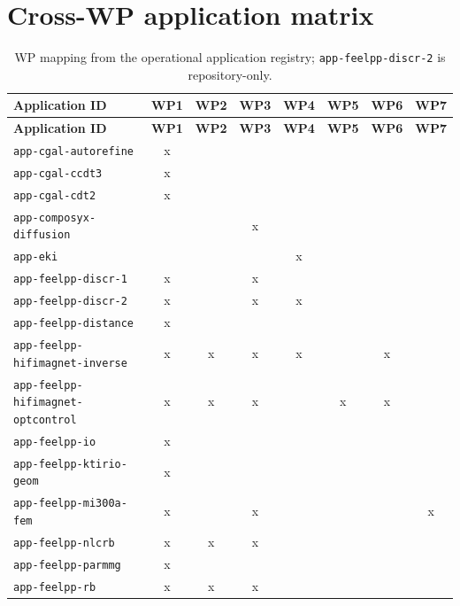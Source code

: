 \section{Cross-WP application matrix}
\label{sec:v3-cross-wp-application-matrix}

\begin{longtable}{@{}p{}ccccccc@{}}
\caption{WP mapping from the operational application registry; \nolinkurl{app-feelpp-discr-2} is repository-only.}
\label{tab:v3-cross-wp-application-matrix}\\
\toprule
\textbf{Application ID} & \textbf{WP1} & \textbf{WP2} & \textbf{WP3} & \textbf{WP4} & \textbf{WP5} & \textbf{WP6} & \textbf{WP7} \\
\midrule
\endfirsthead
\toprule
\textbf{Application ID} & \textbf{WP1} & \textbf{WP2} & \textbf{WP3} & \textbf{WP4} & \textbf{WP5} & \textbf{WP6} & \textbf{WP7} \\
\midrule
\endhead
\nolinkurl{app-cgal-autorefine} & x &  &  &  &  &  &  \\
\nolinkurl{app-cgal-ccdt3} & x &  &  &  &  &  &  \\
\nolinkurl{app-cgal-cdt2} & x &  &  &  &  &  &  \\
\nolinkurl{app-composyx-diffusion} &  &  & x &  &  &  &  \\
\nolinkurl{app-eki} &  &  &  & x &  &  &  \\
\nolinkurl{app-feelpp-discr-1} & x &  & x &  &  &  &  \\
\nolinkurl{app-feelpp-discr-2} & x &  & x & x &  &  &  \\
\nolinkurl{app-feelpp-distance} & x &  &  &  &  &  &  \\
\nolinkurl{app-feelpp-hifimagnet-inverse} & x & x & x & x &  & x &  \\
\nolinkurl{app-feelpp-hifimagnet-optcontrol} & x & x & x &  & x & x &  \\
\nolinkurl{app-feelpp-io} & x &  &  &  &  &  &  \\
\nolinkurl{app-feelpp-ktirio-geom} & x &  &  &  &  &  &  \\
\nolinkurl{app-feelpp-mi300a-fem} & x &  & x &  &  &  & x \\
\nolinkurl{app-feelpp-nlcrb} & x & x & x &  &  &  &  \\
\nolinkurl{app-feelpp-parmmg} & x &  &  &  &  &  &  \\
\nolinkurl{app-feelpp-rb} & x & x & x &  &  &  &  \\

\end{longtable}
